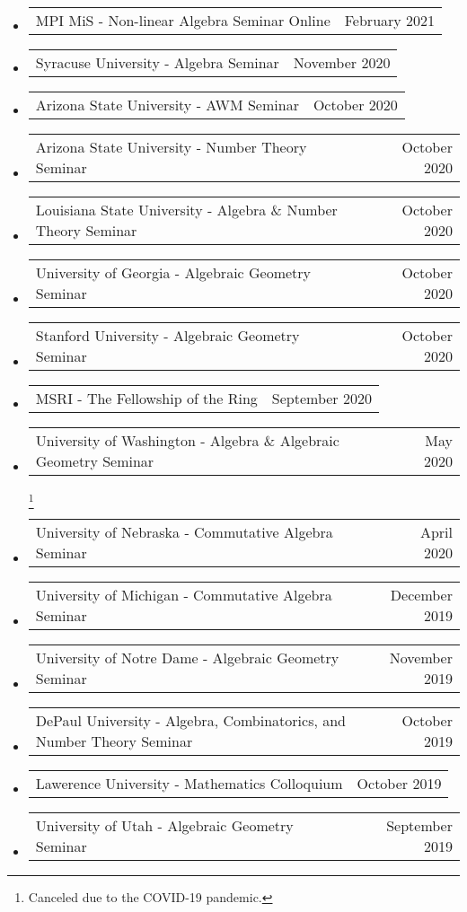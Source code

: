 \documentclass[letterpaper,11pt]{article}
\makeatletter
\newcommand{\ressubheadingTalk}[2]{
\begin{tabular*}{6.5in}[t]{l@{\cftdotfill{\cftsecdotsep}\extracolsep{\fill}}r}
		#1 & #2 \\
\end{tabular*}\vspace{-6pt}}
\makeatother
\begin{document}
\begin{itemize}
\item
	\ressubheadingTalk{MPI MiS - Non-linear Algebra Seminar Online}{February 2021}
	
\item
	\ressubheadingTalk{Syracuse University - Algebra Seminar}{November 2020}
	
\item
	\ressubheadingTalk{Arizona State University - AWM Seminar}{October 2020}

\item
	\ressubheadingTalk{Arizona State University - Number Theory Seminar}{October 2020}

\item
	\ressubheadingTalk{Louisiana State University - Algebra \& Number Theory Seminar}{October 2020}
		
\item
	\ressubheadingTalk{University of Georgia - Algebraic Geometry Seminar}{October 2020}
	
\item
	\ressubheadingTalk{Stanford University - Algebraic Geometry Seminar}{October 2020}
	
\item
	\ressubheadingTalk{MSRI - The Fellowship of the Ring}{September 2020}
	
\item 
	\ressubheadingTalk{University of Washington - Algebra \& Algebraic Geometry Seminar}{May 2020}\footnote[2]{Canceled due to the COVID-19 pandemic.} 


\item 
	\ressubheadingTalk{University of Nebraska - Commutative Algebra Seminar}{April 2020}\footnotemark[2]

\item 
	\ressubheadingTalk{University of Michigan - Commutative Algebra Seminar}{December 2019}

\item
	\ressubheadingTalk{University of Notre Dame - Algebraic Geometry Seminar}{November 2019}

\item
	\ressubheadingTalk{DePaul University - Algebra, Combinatorics, and Number Theory Seminar}{October 2019}{}{}
	
\item
	\ressubheadingTalk{Lawerence University - Mathematics Colloquium}{October 2019}{}{}

\item
	\ressubheadingTalk{University of Utah - Algebraic Geometry Seminar}{September 2019}


\end{itemize}
\end{document}
